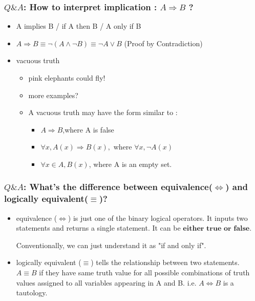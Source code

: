 \documentclass{beamer}
\begin{document}
\begin{frame}
    \frametitle{$Q\&A$: How to interpret implication : $A\Rightarrow B$ ?}
    \begin{itemize}
        \item A implies B / if A then B / A only if B
        \item $A\Rightarrow B \equiv \neg(A\wedge \neg B) \equiv \neg A\vee B$ (Proof by Contradiction)
        \item vacuous truth
              \begin{itemize}
                  \item pink elephants could fly!
                  \item more examples?
                  \item A vacuous truth may have the form similar to :
                        \begin{itemize}
                            \item $A\Rightarrow B$,where A is false
                            \item $\forall x, A(x)\Rightarrow B(x),$ where $\forall x, \neg A(x)$
                            \item $\forall x\in A, B(x)$, where A is an empty set.
                        \end{itemize}
              \end{itemize}
    \end{itemize}
\end{frame}

\begin{frame}
    \frametitle{$Q\&A$: What's the difference between \textbf{equivalence($\Leftrightarrow$)} and \textbf{logically equivalent($\equiv$)}?}
    \begin{itemize}
        \item equivalence ($\Leftrightarrow$) is just one of the binary logical operators. It inputs two statements and returns a single statement. It can be $\textbf{either true or false}$.

              Conventionally, we can just understand it as "if and only if".
        \item logically equivalent ($\equiv$) tells the relationship between two statements. $A\equiv B$ if they have same truth value for all possible combinations of truth values assigned to all variables appearing in A and B. i.e. $A\Leftrightarrow B$ is a tautology.
    \end{itemize}
\end{frame}
\end{document}
